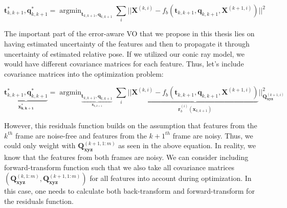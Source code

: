 \documentclass[12pt]{report}
\numberwithin{figure}{section}
\newcommand{\argmin}{\mathop{\mathrm{argmin}}}
\begin{document}
\begin{equation} \mathbf{t}_{k,k+1}^*, \mathbf{q}_{k,k+1}^* =
\argmin_{\mathbf{t}_{k,k+1}, \mathbf{q}_{k,k+1}} \sum_i|| \mathbf{X}^{(k,i)} -
f_b(\mathbf{t}_{k,k+1}, \mathbf{q}_{k,k+1}, \mathbf{X}^{(k+1,i)})||^2
\end{equation}

The important part of the error-aware VO that we propose in this thesis lies on
having estimated uncertainty of the features and then to propagate it through
uncertainty of estimated relative pose.  If we utilized our conic ray model, we
would have different covariance matrices for each feature.  Thus, let's include
covariance matrices into the optimization problem:

\begin{equation} \underbrace{\mathbf{t}_{k,k+1}^*,
\mathbf{q}_{k,k+1}^*}_{\mathbf{x^*_{k,k+1}}} =
\argmin_{\underbrace{\mathbf{t}_{k,k+1},
\mathbf{q}_{k,k+1}}_{\mathbf{x}_{k,k+1}}} \sum_i||
\underbrace{\mathbf{X}^{(k,i)} - f_b(\mathbf{t}_{k,k+1}, \mathbf{q}_{k,k+1},
\mathbf{X}^{(k+1,i)})} _{\mathbf{r}^{(i)}_{b}(\mathbf{x}_{k,k+1})}
||^2_{\mathbf{Q}^{(k+1,i)}_{\mathbf{xyz}}} \end{equation}


However, this residuals function builds on the assumption that features from
the $k^{th}$ frame are noise-free and features from the $k+1^{th}$ frame are
noisy.  Thus, we could only weight with $\mathbf{Q}^{(k+1,1:m)}_{\mathbf{xyz}}$
as seen in the above equation.  In reality, we know that the features from both
frames are noisy. We can consider including forward-transform function such
that we also take all covariance matrices
$(\mathbf{Q}^{(k,1:m)}_{\mathbf{xyz}}, \mathbf{Q}^{(k+1,1:m)}_{\mathbf{xyz}})$
for all features into account during optimization.  In this case, one needs to
calculate both back-transform and forward-transform for the residuals function.
\end{document}
